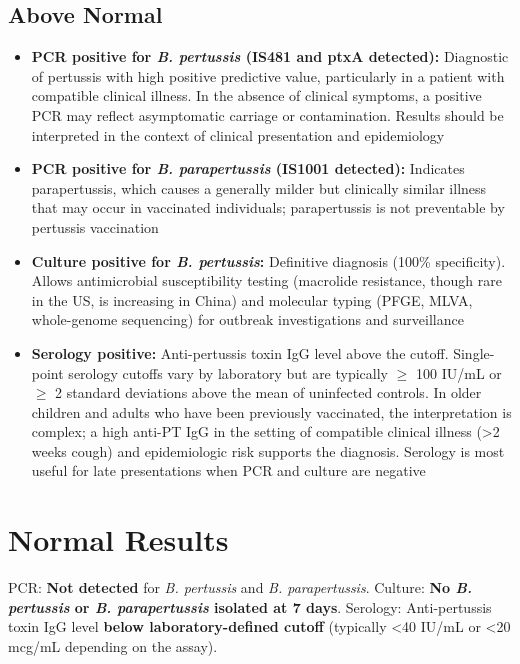 \subsection*{Above Normal}
\begin{itemize}
  \item \textbf{PCR positive for \textit{B. pertussis} (IS481 and ptxA detected):} Diagnostic of pertussis with high positive predictive value, particularly in a patient with compatible clinical illness. In the absence of clinical symptoms, a positive PCR may reflect asymptomatic carriage or contamination. Results should be interpreted in the context of clinical presentation and epidemiology
  \item \textbf{PCR positive for \textit{B. parapertussis} (IS1001 detected):} Indicates parapertussis, which causes a generally milder but clinically similar illness that may occur in vaccinated individuals; parapertussis is not preventable by pertussis vaccination
  \item \textbf{Culture positive for \textit{B. pertussis}:} Definitive diagnosis (100\% specificity). Allows antimicrobial susceptibility testing (macrolide resistance, though rare in the US, is increasing in China) and molecular typing (PFGE, MLVA, whole-genome sequencing) for outbreak investigations and surveillance
  \item \textbf{Serology positive:} Anti-pertussis toxin IgG level above the cutoff. Single-point serology cutoffs vary by laboratory but are typically $\geq$ 100 IU/mL or $\geq$ 2 standard deviations above the mean of uninfected controls. In older children and adults who have been previously vaccinated, the interpretation is complex; a high anti-PT IgG in the setting of compatible clinical illness (>2 weeks cough) and epidemiologic risk supports the diagnosis. Serology is most useful for late presentations when PCR and culture are negative
\end{itemize}

\section*{Normal Results}
PCR: \textbf{Not detected} for \textit{B. pertussis} and \textit{B. parapertussis}. Culture: \textbf{No \textit{B. pertussis} or \textit{B. parapertussis} isolated at 7 days}. Serology: Anti-pertussis toxin IgG level \textbf{below laboratory-defined cutoff} (typically <40 IU/mL or <20 mcg/mL depending on the assay).

